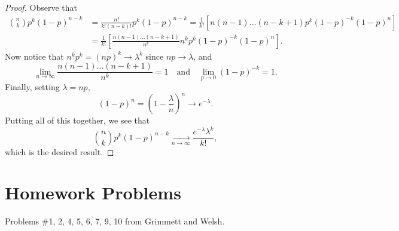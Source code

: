 \begin{proof}
  Observe that
  \begin{align*}
    \binom{n}{k} p^k (1 - p)^{n - k}
    &= \frac{n!}{k!(n - k)!} p^k (1 - p)^{n - k}
    = \frac{1}{k!} \left[n(n - 1) \dots (n - k + 1)p^k(1 - p)^{-k} (1 - p)^n\right] \\
    &= \frac{1}{k!} \left[\frac{n(n - 1) \dots (n - k + 1)}{n^k} n^k p^k (1 - p)^{-k} (1 - p)^n\right].
  \end{align*}
  Now notice that $n^k p^k = (np)^k \to \lambda^k$
  since $np \to \lambda$, and
  \[
    \lim_{n \to \infty} \frac{n(n - 1) \dots (n - k + 1)}{n^k} = 1
    \quad \text{and} \quad
    \lim_{p \to 0} (1 - p)^{-k} = 1.
  \]
  Finally, setting $\lambda = np$,
  \[
    (1 - p)^n =
    \left(1 - \frac{\lambda}{n}\right)^n
    \to e^{-\lambda}.
  \]
  Putting all of this together, we see that
  \[
    \binom{n}{k} p^k (1 - p)^{n - k} \xrightarrow[n \to \infty]{} \frac{e^{-\lambda} \lambda^k}{k!},
  \]
  which is the desired result.
\end{proof}

\section{Homework Problems}
Problems \#1, 2, 4, 5, 6, 7, 9, 10 from Grimmett and Welsh.
